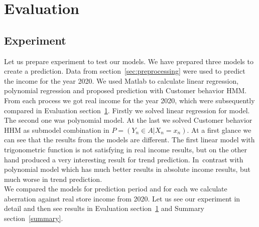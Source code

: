 \chapter{Evaluation} \label{evaluation}
\section{Experiment} \label{experiment}
Let us prepare experiment to test our models.
We have prepared three models to create a prediction.
Data from section~\ref{sec:preprocessing} were used to predict the income for the year 2020.
We used Matlab to calculate linear regression, polynomial regression and proposed prediction with Customer behavior HMM.
From each process we got real income for the year 2020, which were subsequently compared in Evaluation section~\ref{evaluation}.
Firstly we solved linear regression for model.
The second one was polynomial model.
At the last we solved Customer behavior HHM as submodel combination in $P = (Y_n \in A|X_n = x_n)$.
At a first glance we can see that the results from the models are different.
The first linear model with trigonometric function is not satisfying in real income results, but on the other hand produced a very interesting result for trend prediction.
In~contrast with polynomial model which has much better results in absolute income results, but much worse in trend prediction.\\
We compared the models for prediction period and for each we calculate aberration against real store income from 2020.
Let us see our experiment in detail and then see results in Evaluation section~\ref{evaluation} and Summary section~\ref{summary}.\\
